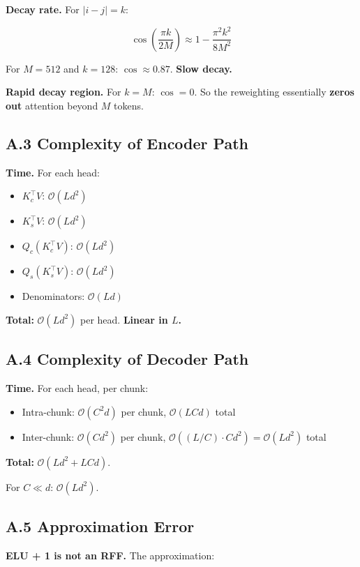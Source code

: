 \textbf{Decay rate.} For $|i - j| = k$:

\[
\cos\!\left(\frac{\pi k}{2M}\right) \approx 1 - \frac{\pi^2 k^2}{8M^2}
\]

For $M = 512$ and $k = 128$: $\cos \approx 0.87$. \textbf{Slow decay.}

\textbf{Rapid decay region.} For $k = M$: $\cos = 0$. So the reweighting 
essentially \textbf{zeros out} attention beyond $M$ tokens.

\subsection{A.3 Complexity of Encoder Path}

\textbf{Time.} For each head:
\begin{itemize}
\item $K_c^\top V$: $\mathcal{O}(L d^2)$
\item $K_s^\top V$: $\mathcal{O}(L d^2)$
\item $Q_c (K_c^\top V)$: $\mathcal{O}(L d^2)$
\item $Q_s (K_s^\top V)$: $\mathcal{O}(L d^2)$
\item Denominators: $\mathcal{O}(L d)$

\end{itemize}
\textbf{Total:} $\mathcal{O}(L d^2)$ per head. \textbf{Linear in $L$.}

\subsection{A.4 Complexity of Decoder Path}

\textbf{Time.} For each head, per chunk:
\begin{itemize}
\item Intra-chunk: $\mathcal{O}(C^2 d)$ per chunk, $\mathcal{O}(L C d)$ total
\item Inter-chunk: $\mathcal{O}(C d^2)$ per chunk, $\mathcal{O}((L/C) \cdot C d^2) = \mathcal{O}(L d^2)$ total

\end{itemize}
\textbf{Total:} $\mathcal{O}(L d^2 + L C d)$.

For $C \ll d$: $\mathcal{O}(L d^2)$.

\subsection{A.5 Approximation Error}

\textbf{ELU + 1 is not an RFF.} The approximation:

